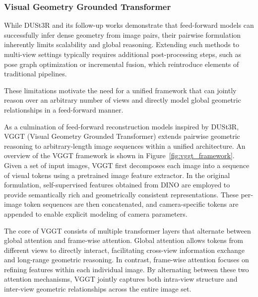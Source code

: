 \subsubsection*{Visual Geometry Grounded Transformer}
While DUSt3R and its follow-up works demonstrate that feed-forward models can successfully infer dense geometry from image pairs, their pairwise formulation inherently limits scalability and global reasoning. Extending such methods to multi-view settings typically requires additional post-processing steps, such as pose graph optimization or incremental fusion, which reintroduce elements of traditional pipelines.

These limitations motivate the need for a unified framework that can jointly reason over an arbitrary number of views and directly model global geometric relationships in a feed-forward manner.

As a culmination of feed-forward reconstruction models inspired by DUSt3R, VGGT (Visual Geometry Grounded Transformer) extends pairwise geometric reasoning to arbitrary-length image sequences within a unified architecture. An overview of the VGGT framework is shown in Figure~\ref{fig:vggt_framework}. Given a set of input images, VGGT first decomposes each image into a sequence of visual tokens using a pretrained image feature extractor. In the original formulation, self-supervised features obtained from DINO are employed to provide semantically rich and geometrically consistent representations. These per-image token sequences are then concatenated, and camera-specific tokens are appended to enable explicit modeling of camera parameters.

The core of VGGT consists of multiple transformer layers that alternate between global attention and frame-wise attention. Global attention allows tokens from different views to directly interact, facilitating cross-view information exchange and long-range geometric reasoning. In contrast, frame-wise attention focuses on refining features within each individual image. By alternating between these two attention mechanisms, VGGT jointly captures both intra-view structure and inter-view geometric relationships across the entire image set.

